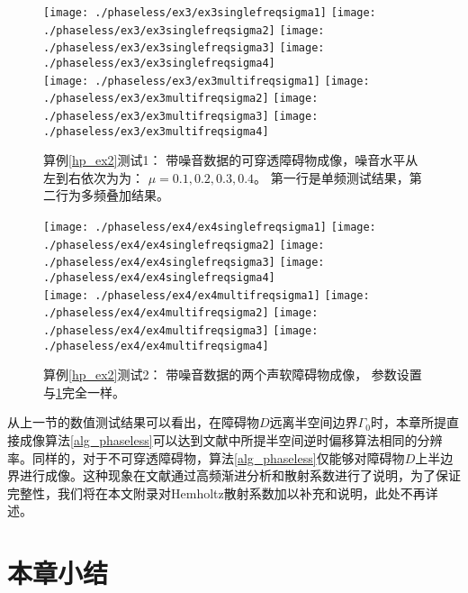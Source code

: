 \begin{figure}[h]
  \centering
  \texttt{[image: ./phaseless/ex3/ex3singlefreqsigma1]}
  \texttt{[image: ./phaseless/ex3/ex3singlefreqsigma2]}
  \texttt{[image: ./phaseless/ex3/ex3singlefreqsigma3]}
  \texttt{[image: ./phaseless/ex3/ex3singlefreqsigma4]}\\
  \texttt{[image: ./phaseless/ex3/ex3multifreqsigma1]}
  \texttt{[image: ./phaseless/ex3/ex3multifreqsigma2]}
  \texttt{[image: ./phaseless/ex3/ex3multifreqsigma3]}
  \texttt{[image: ./phaseless/ex3/ex3multifreqsigma4]}
    \caption{算例\ref{hp_ex2}测试1： 带噪音数据的可穿透障碍物成像，噪音水平从左到右依次为为： $\mu=0.1,0.2,0.3,0.4$。
    第一行是单频测试结果，第二行为多频叠加结果。}\label{fig3}
\end{figure}
\begin{figure}[h]
  \centering
    \texttt{[image: ./phaseless/ex4/ex4singlefreqsigma1]}
  \texttt{[image: ./phaseless/ex4/ex4singlefreqsigma2]}
  \texttt{[image: ./phaseless/ex4/ex4singlefreqsigma3]}
  \texttt{[image: ./phaseless/ex4/ex4singlefreqsigma4]}\\
      \texttt{[image: ./phaseless/ex4/ex4multifreqsigma1]}
  \texttt{[image: ./phaseless/ex4/ex4multifreqsigma2]}
  \texttt{[image: ./phaseless/ex4/ex4multifreqsigma3]}
  \texttt{[image: ./phaseless/ex4/ex4multifreqsigma4]}
    \caption{算例\ref{hp_ex2}测试2： 带噪音数据的两个声软障碍物成像， 参数设置与\ref{fig3}完全一样。}\label{fig4}
\end{figure}
\begin{remark}
从上一节的数值测试结果可以看出，在障碍物$D$远离半空间边界$\Gamma_0$时，本章所提直接成像算法\ref{alg_phaseless}可以达到文献\cite{ch_ha}中所提半空间逆时偏移算法相同的分辨率。同样的，对于不可穿透障碍物，算法\ref{alg_phaseless}仅能够对障碍物$D$上半边界进行成像。这种现象在文献\cite{ch_ha}通过高频渐进分析和散射系数进行了说明，为了保证完整性，我们将在本文附录对Hemholtz散射系数加以补充和说明，此处不再详述。
\end{remark}
\section{本章小结}

